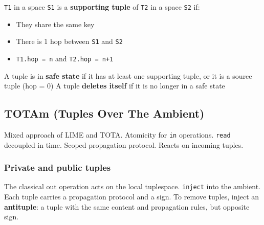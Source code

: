 \documentclass[a4paper]{report}
\begin{document}
\texttt{T1} in a space \texttt{S1} is a \textbf{supporting tuple} of \texttt{T2} in a space \texttt{S2} if:

\begin{itemize}
\item They share the same key
\item There is 1 hop between \texttt{S1} and \texttt{S2}
\item \texttt{T1.hop = n} and \texttt{T2.hop = n+1}
\end{itemize}

A tuple is in \textbf{safe state} if it has at least one supporting tuple, or it is a source tuple (hop = 0) A tuple \textbf{deletes itself} if it is no longer in a safe state

\subsection{TOTAm (Tuples Over The Ambient)}

Mixed approach of LIME and TOTA. Atomicity for \texttt{in} operations. \texttt{read} decoupled in time. Scoped propagation protocol. Reacts on incoming tuples.

\subsubsection{Private and public tuples}

The classical out operation acts on the local tuplespace. \texttt{inject} into the ambient. Each tuple carries a propagation protocol and a sign. To remove tuples, inject an \textbf{antituple}: a tuple with the same content and propagation rules, but opposite sign.
\end{document}
